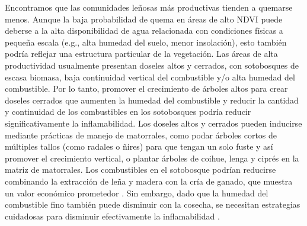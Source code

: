 Encontramos que las comunidades leñosas más productivas tienden a quemarse menos. Aunque la baja probabilidad de quema en áreas de alto NDVI puede deberse a la alta disponibilidad de agua relacionada con condiciones físicas a pequeña escala (e.g., alta humedad del suelo, menor insolación), esto también podría reflejar una estructura particular de la vegetación. Las áreas de alta productividad usualmente presentan doseles altos y cerrados, con sotobosques de escasa biomasa, baja continuidad vertical del combustible y/o alta humedad del combustible. Por lo tanto, promover el crecimiento de árboles altos para crear doseles cerrados que aumenten la humedad del combustible y reducir la cantidad y continuidad de los combustibles en los sotobosques podría reducir significativamente la inflamabilidad. Los doseles altos y cerrados pueden inducirse mediante prácticas de manejo de matorrales, como podar árboles cortos de múltiples tallos (como radales o ñires) para que tengan un solo fuste y así promover el crecimiento vertical, o plantar árboles de coihue, lenga y ciprés en la matriz de matorrales. Los combustibles en el sotobosque podrían reducirse combinando la extracción de leña y madera con la cría de ganado, que muestra un valor económico prometedor \citep{peri_review_2016, goldenberg_efecto_2018, goldenberg_shrubland_2021}. Sin embargo, dado que la humedad del combustible fino también puede disminuir con la cosecha, se necesitan estrategias cuidadosas para disminuir efectivamente la inflamabilidad \citep{goldenberg_effects_2020}. 



